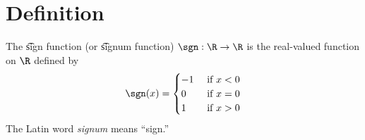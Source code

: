 
\section*{Definition}

The \t{sign function} (or \t{signum function}) $\sgn: \R  \to \R $ is the real-valued function on $\R $ defined by
\[
\sgn(x) = \begin{cases}
-1 & \text{ if } x < 0 \\
0 & \text{ if } x = 0 \\
1 & \text{ if } x > 0 \\
\end{cases}
\]
The Latin word \textit{signum} means ``sign.''

\blankpage
